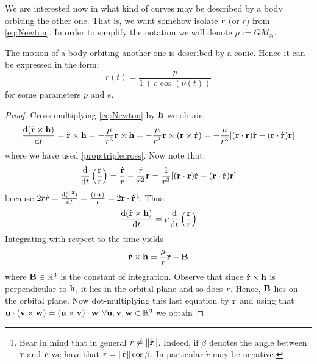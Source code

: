\documentclass[../main.tex]{subfiles}
\begin{document}
We are interested now in what kind of curves may be described by a body orbiting the other one. That is, we want somehow isolate $\boldsymbol{\mathrm{r}}$ (or $r$) from \cref{eq:Newton}. In order to simplify the notation we will denote $\mu:=GM_{\oplus}$.
\begin{proposition}
  \label{prop:two-body}
  The motion of a body orbiting another one is described by a conic. Hence it can be expressed in the form:
  \begin{equation}
    \label{eq:two-body}
    r(t)=\frac{p}{1+e\cos (\nu(t))}
  \end{equation}
  for some parameters $p$ and $e$.
\end{proposition}
\begin{proof}
  Cross-multiplying \cref{eq:Newton} by $\boldsymbol{\mathrm{h}}$ we obtain
  \begin{equation}\label{eq:rtimesh}
    \dv{(\dot{\boldsymbol{\mathrm{r}}}\times\boldsymbol{\mathrm{h}})}{t}=\ddot{\boldsymbol{\mathrm{r}}}\times\boldsymbol{\mathrm{h}}=-\frac{\mu}{r^3}\boldsymbol{\mathrm{r}}\times\boldsymbol{\mathrm{h}}=-\frac{\mu}{r^3}\boldsymbol{\mathrm{r}}\times(\boldsymbol{\mathrm{r}}\times \dot{\boldsymbol{\mathrm{r}}})=-\frac{\mu}{r^3}[(\boldsymbol{\mathrm{r}}\cdot{\boldsymbol{\mathrm{r}}})\dot{\boldsymbol{\mathrm{r}}}-(\boldsymbol{\mathrm{r}}\cdot\dot{\boldsymbol{\mathrm{r}}})\boldsymbol{\mathrm{r}}]
  \end{equation}
  where we have used \cref{prop:triplecross}. Now note that:
  \begin{equation}
    \dv{}{t}\left(\frac{\boldsymbol{\mathrm{r}}}{r}\right)=\frac{\dot{\boldsymbol{\mathrm{r}}}}{r}-\frac{\dot{r}}{r^2}\boldsymbol{\mathrm{r}}= \frac{1}{r^3}[(\boldsymbol{\mathrm{r}}\cdot{\boldsymbol{\mathrm{r}}})\dot{\boldsymbol{\mathrm{r}}}-(\boldsymbol{\mathrm{r}}\cdot\dot{\boldsymbol{\mathrm{r}}})\boldsymbol{\mathrm{r}}]
  \end{equation}
  because $2r\dot{r}=\dv{(r^2)}{t}=\frac{(\boldsymbol{\mathrm{r}}\cdot\boldsymbol{\mathrm{r}})}{t}=2\boldsymbol{\mathrm{r}}\cdot\dot{\boldsymbol{\mathrm{r}}}$\footnote{Bear in mind that in general $\dot{r}\ne\left\|\dot{\boldsymbol{\mathrm{r}}}\right\|$. Indeed, if $\beta$ denotes the angle between $\boldsymbol{\mathrm{r}}$ and $\dot{\boldsymbol{\mathrm{r}}}$ we have that $\dot{r}=\left\|\dot{\boldsymbol{\mathrm{r}}}\right\|\cos\beta$. In particular $\dot{r}$ may be negative.}. Thus:
  \begin{equation}
    \dv{(\dot{\boldsymbol{\mathrm{r}}}\times\boldsymbol{\mathrm{h}})}{t}=\mu \dv{}{t}\left(\frac{\boldsymbol{\mathrm{r}}}{r}\right)
  \end{equation}
  Integrating with respect to the time yields
  \begin{equation}\label{eq:rdottimesh}
    \dot{\boldsymbol{\mathrm{r}}}\times \boldsymbol{\mathrm{h}}=\frac{\mu}{r}\boldsymbol{\mathrm{r}}+\boldsymbol{\mathrm{B}}
  \end{equation}
  where $\boldsymbol{\mathrm{B}}\in\mathbb{R}^3$ is the constant of integration. Observe that since $\dot{\boldsymbol{\mathrm{r}}}\times\boldsymbol{\mathrm{h}}$ is perpendicular to $\boldsymbol{\mathrm{h}}$, it lies in the orbital plane and so does $\boldsymbol{\mathrm{r}}$. Hence, $\boldsymbol{\mathrm{B}}$ lies on the orbital plane. Now dot-multiplying this last equation by $\boldsymbol{\mathrm{r}}$ and using that $\boldsymbol{\mathrm{u}}\cdot(\boldsymbol{\mathrm{v}}\times\boldsymbol{\mathrm{w}})=(\boldsymbol{\mathrm{u}}\times\boldsymbol{\mathrm{v}})\cdot\boldsymbol{\mathrm{w}}$ $\forall\boldsymbol{\mathrm{u}},\boldsymbol{\mathrm{v}},\boldsymbol{\mathrm{w}}\in\mathbb{R}^3$ we obtain

\end{proof}
\end{document}
